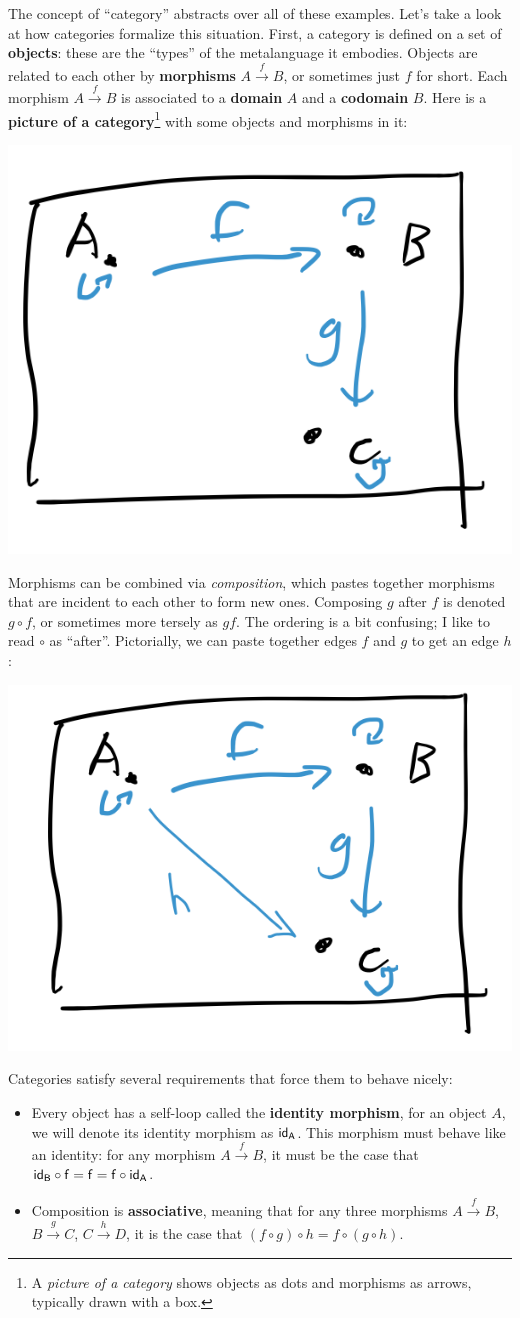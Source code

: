 \noindent
The concept of ``category'' abstracts over all of these examples.
Let's take a look at how categories formalize this situation.
First, a category is defined on a set of \textbf{objects}:
these are the ``types'' of the metalanguage it embodies.
Objects are related to each other by \textbf{morphisms}
\(A \xrightarrow{f} B\), or sometimes just \(f\) for short.
Each morphism \(A \xrightarrow{f} B\) is associated to a
\textbf{domain} \(A\) and a \textbf{codomain} \(B\).
Here is a \textbf{picture of a category}\footnote{A \emph{picture of a category}
shows objects as dots and morphisms as arrows, typically drawn with a box.} with some objects and morphisms in it:
\begin{center}
  \includegraphics[width=0.4\linewidth]{fig/simple-cat1.png}
\end{center}
Morphisms can be combined via \emph{composition},
which pastes together morphisms that are incident to each other to form new ones.
Composing $g$ after $f$ is denoted $g \circ f$, or sometimes more tersely as \(gf\).
The ordering is a bit confusing; I like to read $\circ$ as ``after''.
Pictorially, we can paste together edges $f$ and $g$ to get an edge $h$:
\begin{center}
  \includegraphics[width=0.4\linewidth]{fig/simple-cat2.png}
\end{center}
Categories satisfy several requirements that force them to behave nicely:
\begin{itemize}
  \item Every object has a self-loop called the \textbf{identity morphism},
  for an object $A$, we will denote its identity morphism as $\sf{id}_A$.
  This morphism must behave like an identity: for any morphism $A \xrightarrow{f} B$,
  it must be the case that $\sf{id}_B \circ f = f = f \circ \sf{id}_A$.
  \item Composition is \textbf{associative}, meaning that for any three morphisms
  $A \xrightarrow{f} B$, $B \xrightarrow{g} C$, $C \xrightarrow{h} D$,
  it is the case that $(f \circ g) \circ h = f \circ (g \circ h)$.
\end{itemize}
